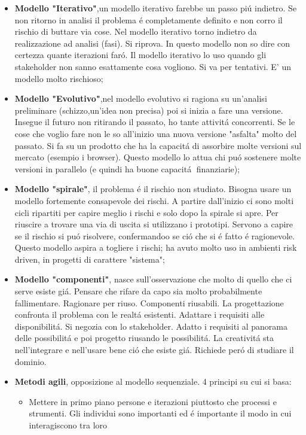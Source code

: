 \documentclass[a4paper,10pt] {article}
\begin{document}
\begin{itemize}
\begin{itemize}
\begin{itemize}
	
	\item \textbf{Modello "Iterativo"},un modello iterativo farebbe un passo 
	pi\'u indietro. Se non ritorno in analisi il problema \'e completamente 
	definito e non corro il rischio di buttare via cose. Nel modello 
	iterativo torno indietro da realizzazione ad analisi (fasi). Si riprova. In 
	questo modello non so dire con certezza quante iterazioni far\'o.
	Il modello iterativo lo uso quando gli stakeholder non sanno esattamente 
	cosa vogliono. Si va per tentativi. E' un modello molto rischioso;
	
	
	\item \textbf{Modello "Evolutivo"},nel modello evolutivo si ragiona su 
	un'analisi preliminare (schizzo,un'idea non precisa) poi si inizia
	a fare una versione. Insegue il futuro non ritirando il passato, ho tante 
	attivit\'a concorrenti. Se le cose
	che voglio fare non le so all'inizio una nuova versione "asfalta" molto del 
	passato. Si fa su un prodotto che ha la capacit\'a di assorbire molte 
	versioni sul mercato (esempio i browser). Questo modello lo attua chi pu\'o 
	sostenere molte versioni in parallelo (e quindi ha buone 
	capacit\'a finanziarie);
	
	
	\item \textbf{Modello "spirale"}, il problema \'e il rischio non studiato. 
	Bisogna usare un modello fortemente consapevole dei rischi. A partire 
	dall'inizio ci sono molti cicli ripartiti per capire meglio i rischi e solo
	dopo la spirale si apre. Per riuscire a trovare una via di uscita si 
	utilizzano i prototipi. Servono a capire se il rischio si pu\'o risolvere, 
	confermandoo se ci\'o che si \'e fatto \'e ragionevole. Questo modello 
	aspira a togliere i rischi; ha avuto molto uso in ambienti risk driven, in 
	progetti di carattere "sistema";
	
	
	\item \textbf{Modello "componenti"}, nasce sull'osservazione che molto di 
	quello che ci serve esiste gi\'a. Pensare che rifare da capo sia molto 
	probabilmente fallimentare. Ragionare per riuso. Componenti riusabili.
	La progettazione confronta il problema con le realt\'a esistenti. Adattare 
	i requisiti alle disponibilit\'a. 
	Si negozia con lo stakeholder. Adatto i requisiti al panorama delle 
	possibilit\'a e poi progetto riusando le possibilit\'a. La creativit\'a sta 
	nell'integrare e nell'usare bene ci\'o che esiste gi\'a. Richiede per\'o di 
	studiare il dominio.
	
	
	\item \textbf{Metodi agili}, opposizione al modello sequenziale. 4 principi 
	su cui si basa:
	\begin{itemize}
	\item Mettere in primo piano persone e iterazioni piuttosto che processi e 
	strumenti. Gli individui sono importanti ed \'e importante il modo in cui 
	interagiscono tra loro
	

\end{itemize}
\end{itemize}
\end{itemize}
\end{itemize}
\end{document}
